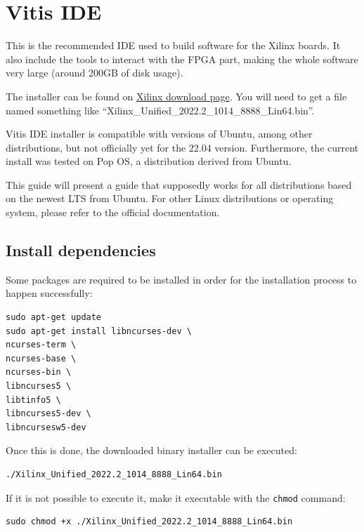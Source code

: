 \documentclass[10pt]{article}
\begin{document}
\section{Vitis IDE}
\label{sec:vitis-ide}
This is the recommended IDE used to build software for the Xilinx boards.
It also include the tools to interact with the FPGA part, making the whole
software very large (around 200GB of disk usage).

The installer can be found on \href{https://www.xilinx.com/support/download/index.html/content/xilinx/en/downloadNav/vitis.html}{Xilinx download page}. You will need to get
a file named something like ``Xilinx\_Unified\_2022.2\_1014\_8888\_Lin64.bin''.

Vitis IDE installer is compatible with versions of Ubuntu, among other distributions,
but not officially yet for the 22.04 version.
Furthermore, the current install was tested on Pop OS, a distribution derived from Ubuntu.

This guide will present a guide that supposedly works for all distributions based on the newest
LTS from Ubuntu. For other Linux distributions or operating system, please refer to the official documentation.


\subsection{Install dependencies}
\label{sec:install-dependencies}
Some packages are required to be installed in order for the installation process to happen successfully:
\begin{tcolorbox}
\begin{verbatim}
sudo apt-get update
sudo apt-get install libncurses-dev \
ncurses-term \
ncurses-base \
ncurses-bin \
libncurses5 \
libtinfo5 \
libncurses5-dev \
libncursesw5-dev
\end{verbatim}
\end{tcolorbox}

Once this is done, the downloaded binary installer can be executed:
\begin{tcolorbox}
\begin{verbatim}
./Xilinx_Unified_2022.2_1014_8888_Lin64.bin
\end{verbatim}
\end{tcolorbox}

If it is not possible to execute it, make it executable with the \verb|chmod| command:
\begin{tcolorbox}
\begin{verbatim}
sudo chmod +x ./Xilinx_Unified_2022.2_1014_8888_Lin64.bin
\end{verbatim}
\end{tcolorbox}
\end{document}
